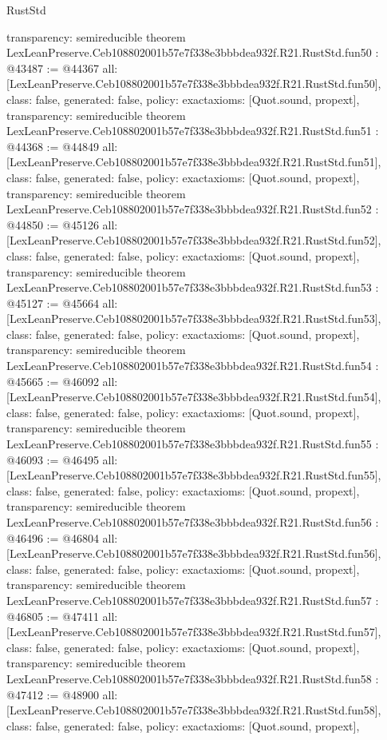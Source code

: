 \begin{lexlean}{RustStd}
\begin{coremodule}
{  transparency: semireducible
}
theorem LexLeanPreserve.Ceb108802001b57e7f338e3bbbdea932f.R21.RustStd.fun50 : @43487 := @44367 {
  all: [LexLeanPreserve.Ceb108802001b57e7f338e3bbbdea932f.R21.RustStd.fun50],
  class: false,
  generated: false,
  policy: exact{axioms: [Quot.sound, propext]},
  transparency: semireducible
}
theorem LexLeanPreserve.Ceb108802001b57e7f338e3bbbdea932f.R21.RustStd.fun51 : @44368 := @44849 {
  all: [LexLeanPreserve.Ceb108802001b57e7f338e3bbbdea932f.R21.RustStd.fun51],
  class: false,
  generated: false,
  policy: exact{axioms: [Quot.sound, propext]},
  transparency: semireducible
}
theorem LexLeanPreserve.Ceb108802001b57e7f338e3bbbdea932f.R21.RustStd.fun52 : @44850 := @45126 {
  all: [LexLeanPreserve.Ceb108802001b57e7f338e3bbbdea932f.R21.RustStd.fun52],
  class: false,
  generated: false,
  policy: exact{axioms: [Quot.sound, propext]},
  transparency: semireducible
}
theorem LexLeanPreserve.Ceb108802001b57e7f338e3bbbdea932f.R21.RustStd.fun53 : @45127 := @45664 {
  all: [LexLeanPreserve.Ceb108802001b57e7f338e3bbbdea932f.R21.RustStd.fun53],
  class: false,
  generated: false,
  policy: exact{axioms: [Quot.sound, propext]},
  transparency: semireducible
}
theorem LexLeanPreserve.Ceb108802001b57e7f338e3bbbdea932f.R21.RustStd.fun54 : @45665 := @46092 {
  all: [LexLeanPreserve.Ceb108802001b57e7f338e3bbbdea932f.R21.RustStd.fun54],
  class: false,
  generated: false,
  policy: exact{axioms: [Quot.sound, propext]},
  transparency: semireducible
}
theorem LexLeanPreserve.Ceb108802001b57e7f338e3bbbdea932f.R21.RustStd.fun55 : @46093 := @46495 {
  all: [LexLeanPreserve.Ceb108802001b57e7f338e3bbbdea932f.R21.RustStd.fun55],
  class: false,
  generated: false,
  policy: exact{axioms: [Quot.sound, propext]},
  transparency: semireducible
}
theorem LexLeanPreserve.Ceb108802001b57e7f338e3bbbdea932f.R21.RustStd.fun56 : @46496 := @46804 {
  all: [LexLeanPreserve.Ceb108802001b57e7f338e3bbbdea932f.R21.RustStd.fun56],
  class: false,
  generated: false,
  policy: exact{axioms: [Quot.sound, propext]},
  transparency: semireducible
}
theorem LexLeanPreserve.Ceb108802001b57e7f338e3bbbdea932f.R21.RustStd.fun57 : @46805 := @47411 {
  all: [LexLeanPreserve.Ceb108802001b57e7f338e3bbbdea932f.R21.RustStd.fun57],
  class: false,
  generated: false,
  policy: exact{axioms: [Quot.sound, propext]},
  transparency: semireducible
}
theorem LexLeanPreserve.Ceb108802001b57e7f338e3bbbdea932f.R21.RustStd.fun58 : @47412 := @48900 {
  all: [LexLeanPreserve.Ceb108802001b57e7f338e3bbbdea932f.R21.RustStd.fun58],
  class: false,
  generated: false,
  policy: exact{axioms: [Quot.sound, propext]},
}
\end{coremodule}
\end{lexlean}
